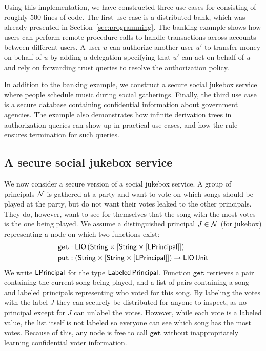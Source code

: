 Using this implementation, we have constructed three use cases for \lang{} consisting of roughly 500 lines of code. The first use case is a distributed bank, which was already presented in Section~\ref{sec:programming}. The banking example shows how users can perform remote procedure calls to handle transactions across accounts between different users. A user $u$ can authorize another user $u'$ to transfer money on behalf of $u$ by adding a delegation specifying that $u'$ can act on behalf of $u$ and rely on forwarding trust queries to resolve the authorization policy.

In addition to the banking example, we construct a secure social jukebox service where people schedule music during social gatherings. Finally, the third use case is a secure database containing confidential information about government agencies. The example also demonstrates how infinite derivation trees in authorization queries can show up in practical use cases, and how the  rule ensures termination for such queries.

\subsection{A secure social jukebox service}\label{subsec:jukebox}
We now consider a secure version of a social jukebox service. A group of principals $\mathcal{N}$ is gathered at a party and want to vote on which songs should be played at the party, but do not want their votes leaked to the other principals. They do, however, want to see for themselves that the song with the most votes is the one being played. We assume a distinguished principal $J \in \mathcal{N}$ (for jukebox) representing a node on which two functions exist:
\begin{align*}
\mathtt{get}&: \mathsf{LIO}\,(\mathsf{String} \times \lbrack\mathsf{String} \times \lbrack\mathsf{LPrincipal}\rbrack\rbrack)\\
\mathtt{put}&: (\mathsf{String} \times \lbrack\mathsf{String} \times \lbrack\mathsf{LPrincipal}\rbrack\rbrack) \to \mathsf{LIO}\,\mathsf{Unit}
\end{align*}
We write $\mathsf{LPrincipal}$ for the type $\mathsf{Labeled}\,\mathsf{Principal}$. Function $\mathtt{get}$ retrieves a pair containing the current song being played, and a list of pairs containing a song and labeled principals representing who voted for this song. By labeling the votes with the label $J$ they can securely be distributed for anyone to inspect, as no principal except for $J$ can unlabel the votes. However, while each vote is a labeled value, the list itself is not labeled so everyone can see which song has the most votes. Because of this, any node is free to call $\mathtt{get}$ without inappropriately learning confidential voter information.

